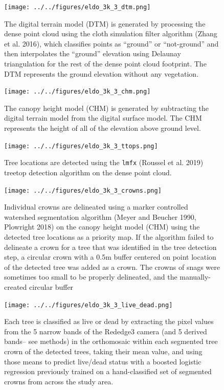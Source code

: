 \documentclass[]{article}
\begin{document}
\begin{figure}
\centering
\texttt{[image: ../../figures/eldo\_3k\_3\_dtm.png]}
\caption{The digital terrain model (DTM) is generated by processing the
dense point cloud using the cloth simulation filter algorithm (Zhang et
al. 2016), which classifies points as ``ground'' or ``not-ground'' and
then interpolates the ``ground'' elevation using Delaunay triangulation
for the rest of the dense point cloud footprint. The DTM represents the
ground elevation without any vegetation.}
\end{figure}

\begin{figure}
\centering
\texttt{[image: ../../figures/eldo\_3k\_3\_chm.png]}
\caption{The canopy height model (CHM) is generated by subtracting the
digital terrain model from the digital surface model. The CHM represents
the height of all of the elevation above ground level.}
\end{figure}

\begin{figure}
\centering
\texttt{[image: ../../figures/eldo\_3k\_3\_ttops.png]}
\caption{Tree locations are detected using the \texttt{lmfx} (Roussel et
al. 2019) treetop detection algorithm on the dense point cloud.}
\end{figure}

\begin{figure}
\centering
\texttt{[image: ../../figures/eldo\_3k\_3\_crowns.png]}
\caption{Individual crowns are delineated using a marker controlled
watershed segmentation algorithm (Meyer and Beucher 1990, Plowright
2018) on the canopy height model (CHM) using the detected tree locations
as a priority map. If the algorithm failed to delineate a crown for a
tree that was identified in the tree detection step, a circular crown
with a 0.5m buffer centered on point location of the detected tree was
added as a crown. The crowns of snags were sometimes too small to be
properly delineated, and the manually-created circular buffer}
\end{figure}

\begin{figure}
\centering
\texttt{[image: ../../figures/eldo\_3k\_3\_live\_dead.png]}
\caption{Each tree is classified as live or dead by extracting the pixel
values from the 5 narrow bands of the Rededge3 camera (and 5 derived
bands-- see methods) in the orthomosaic within each segmented tree crown
of the detected trees, taking their mean value, and using those means to
predict live/dead status with a boosted logistic regression previously
trained on a hand-classified set of segmented crowns from across the
study area.}
\end{figure}
\end{document}
